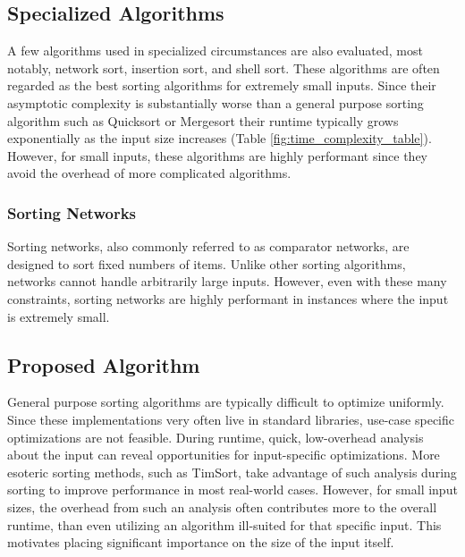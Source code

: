 \documentclass[letter, 12pt, conference]{ieeeconf}
\begin{document}
\subsection{Specialized Algorithms}

A few algorithms used in specialized circumstances are also evaluated, most
notably, network sort, insertion sort, and shell sort. These algorithms are
often regarded as the best sorting algorithms for extremely small inputs. Since
their asymptotic complexity is substantially worse than a general purpose
sorting algorithm such as Quicksort or Mergesort their runtime typically grows
exponentially as the input size increases (Table
\ref{fig:time_complexity_table}). However, for small inputs, these algorithms
are highly performant since they avoid the overhead of more complicated
algorithms.

\subsubsection{Sorting Networks}

Sorting networks, also commonly referred to as comparator networks, are designed
to sort fixed numbers of items. Unlike other sorting algorithms, networks cannot
handle arbitrarily large inputs. However, even with these many constraints,
sorting networks are highly performant in instances where the input is extremely
small.


\subsection{Proposed Algorithm}

General purpose sorting algorithms are typically difficult to optimize
uniformly. Since these implementations very often live in standard libraries,
use-case specific optimizations are not feasible. During runtime, quick,
low-overhead analysis about the input can reveal opportunities for
input-specific optimizations. More esoteric sorting methods, such as TimSort,
take advantage of such analysis during sorting to improve performance in most
real-world cases. However, for small input sizes, the overhead from such an
analysis often contributes more to the overall runtime, than even utilizing an
algorithm ill-suited for that specific input\parencite{the_basic_algorithms}.
This motivates placing significant importance on the size of the input itself.
\end{document}
